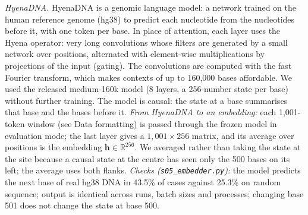 \documentclass[11pt]{article}
\newcommand{\file}[1]{\nolinkurl{#1}}
\begin{document}
\emph{HyenaDNA.} HyenaDNA is a genomic language model: a network trained on the
human reference genome (hg38) to predict each nucleotide from the nucleotides before it, with one token per
base. In place of attention, each layer uses the Hyena operator: very long
convolutions whose filters are generated by a small network over positions, alternated with element-wise
multiplications by projections of the input (gating). The convolutions are computed with the fast Fourier
transform, which makes contexts of up to 160,000 bases affordable. We used the released medium-160k model
(8 layers, a 256-number state per base) without further training. The model is causal: the state at a base
summarises that base and the bases before it. \emph{From HyenaDNA to an embedding:} each 1,001-token window
(see Data formatting) is passed through the frozen model in evaluation mode; the last layer gives a
$1{,}001\times256$ matrix, and its average over positions is the embedding $\mathbf{h}\in\mathbb{R}^{256}$.
We averaged rather than taking the state at the site because a causal state at the centre has seen only the
500 bases on its left; the average uses both flanks. \emph{Checks (\file{s05_embedder.py}):} the model
predicts the next base of real hg38 DNA in 43.5\% of cases against 25.3\% on random sequence; output is
identical across runs, batch sizes and processes; changing base 501 does not change the state at base 500.
\end{document}
